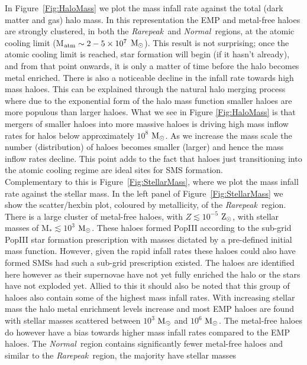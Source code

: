 \documentclass[twocolumn,iop,revtex4]{openjournal}
\newcommand{\msolar} {$\rm{M_{\odot}}~$}
\newcommand{\msolarc} {$\rm{M_{\odot}}$}
\newcommand{\zsolarc} {$\rm{Z_{\odot}}$}
\newcommand{\rarepeak} {\textit{Rarepeak~}}
\newcommand{\normal} {\textit{Normal~}}
\begin{document}
In Figure~\ref{Fig:HaloMass} we plot the mass infall rate against the total (dark matter
and gas) halo mass. In this representation the EMP and metal-free haloes are strongly clustered, in both
the \rarepeak and \normal regions, at the atomic cooling limit (M$_{\rm atm} \sim 2 - 5 \times 10^7$
\msolarc). This result is not surprising; once the atomic cooling limit is reached, star formation
will begin (if it hasn't already), and from that point onwards, it is only a matter of time before
the halo becomes metal enriched. There is also a noticeable decline in the infall rate towards high mass haloes.
This can be explained through the natural halo merging process where due to the exponential form of the halo mass
function smaller haloes are more populous than larger haloes. What we see in Figure \ref{Fig:HaloMass} is that mergers of smaller haloes
into more massive haloes is driving high mass inflow rates for halos below approximately $10^{8}$ \msolarc. As we increase the mass
scale the number (distribution) of haloes becomes smaller (larger) and hence the mass inflow rates decline. This point adds to
the fact that haloes just transitioning into the atomic cooling regime are ideal sites for SMS formation. \\
\indent Complementary to this is Figure~\ref{Fig:StellarMass}, 
where we plot the mass infall rate against the stellar mass. In the left panel of Figure~\ref{Fig:StellarMass}
we show the scatter/hexbin plot, coloured by metallicity, of the
\rarepeak region. There is a large cluster of metal-free haloes, with $Z \lesssim 10^{-5}$ \zsolarc,
with stellar masses of M$_{*} \lesssim 10^3$ \msolarc. These haloes formed PopIII
according to the sub-grid PopIII star formation prescription with masses dictated 
by a pre-defined initial mass function. However, given the rapid infall rates these 
haloes could also have formed SMSs had such a sub-grid prescription existed. The
haloes are identified here however as their supernovae have not yet fully enriched the 
halo or the stars have not exploded yet. Allied to this 
it should also be noted that this group of haloes also contain some of the highest mass infall
rates. With increasing stellar mass the halo metal enrichment levels increase and most EMP haloes
are found with stellar masses scattered between $10^{3}$ \msolar and $10^{6}$ \msolarc. The metal-free haloes
do however have a bias towards higher mass infall rates compared to the EMP haloes.
The \normal region contains significantly fewer metal-free haloes and
similar to the \rarepeak region, the majority have stellar masses
\end{document}
